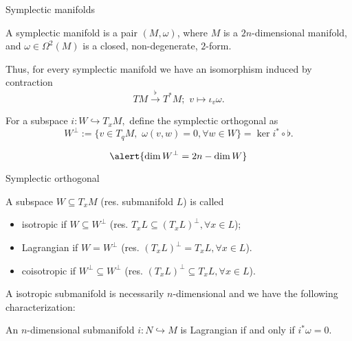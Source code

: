 \begin{frame}{Symplectic manifolds}
   \begin{definition} A \alert{symplectic manifold} is a pair $(M, \omega)$, where $M$ is a $2n$-dimensional manifold, and $\omega \in \Omega^2(M)$ is a closed, non-degenerate, $2$-form.
   \end{definition}
   \pause
   Thus, for every symplectic manifold we have an isomorphism induced by contraction $$TM \xrightarrow{\flat} T^\ast M; \,\, v \mapsto \iota_v \omega.$$ 
   \pause
   \begin{definition} For a subspace $i: W \hookrightarrow T_x M,$ define the \alert{symplectic orthogonal} as $$W^\perp := \{v \in T_q M, \,\, \omega(v, w) = 0, \forall w \in W \} = \ker i^\ast \circ \flat.$$
   \end{definition}

   $$\alert{\dim W^\perp = 2n - \dim W}$$
\end{frame}

\begin{frame}{Symplectic orthogonal}
\begin{definition} A subspace $W \subseteq T_xM$ (res. submanifold $L$) is called
\begin{itemize}
    \item \alert{isotropic} if $W \subseteq W^\perp$ (res. $T_x L \subseteq (T_x L)^\perp, \forall x \in L$);
    \item \alert{Lagrangian} if $W = W^\perp$ (res. $(T_x L)^\perp = T_x L, \forall x \in L$).
    \item \alert{coisotropic} if $ W^\perp \subseteq W^\perp$ (res. $(T_x L)^\perp \subseteq T_x L, \forall x \in L$).
\end{itemize}
\end{definition}
\pause
A isotropic submanifold is necessarily $n$-dimensional and we have the following characterization:
\begin{proposition} An $n$-dimensional submanifold $i: N \hookrightarrow M$ is Lagrangian if and only if $i^\ast \omega = 0.$
\end{proposition}
\end{frame}

